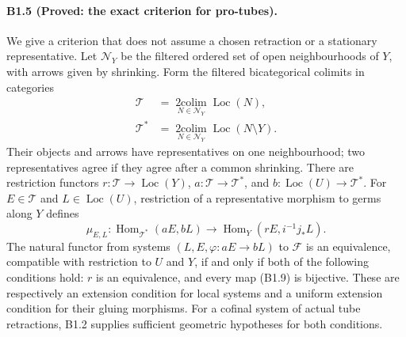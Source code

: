 \paragraph{B1.5 (Proved: the exact criterion for pro-tubes).}
We give a criterion that does not assume a chosen retraction or a
stationary representative. Let $\mathcal N_Y$ be the filtered ordered
set of open neighbourhoods of $Y$, with arrows given by shrinking.
Form the filtered bicategorical colimits in categories
\[
 \begin{aligned}
 \mathcal T&=\operatorname*{2colim}_{N\in\mathcal N_Y}
                         \operatorname{Loc}(N),\\
 \mathcal T^*&=\operatorname*{2colim}_{N\in\mathcal N_Y}
                         \operatorname{Loc}(N\setminus Y).
 \end{aligned}
 \tag{B1.8}
\]
Their objects and arrows have representatives on one neighbourhood;
two representatives agree if they agree after a common shrinking.
There are restriction functors
$r:\mathcal T\to\operatorname{Loc}(Y)$,
$a:\mathcal T\to\mathcal T^*$, and
$b:\operatorname{Loc}(U)\to\mathcal T^*$.
For $E\in\mathcal T$ and $L\in\operatorname{Loc}(U)$, restriction of
a representative morphism to germs along $Y$ defines
\[
 \mu_{E,L}:\operatorname{Hom}_{\mathcal T^*}(aE,bL)
 \longrightarrow
 \operatorname{Hom}_{Y}(rE,i^{-1}j_*L).
 \tag{B1.9}
\]
The natural functor from systems $(L,E,\varphi:aE\to bL)$ to
$\mathcal F$ is an equivalence, compatible with restriction to $U$
and $Y$, if and only if both of the following conditions hold:
$r$ is an equivalence, and every map (B1.9) is bijective.
These are respectively an extension condition for local systems and a
uniform extension condition for their gluing morphisms. For a
cofinal system of actual tube retractions, B1.2 supplies sufficient
geometric hypotheses for both conditions.


